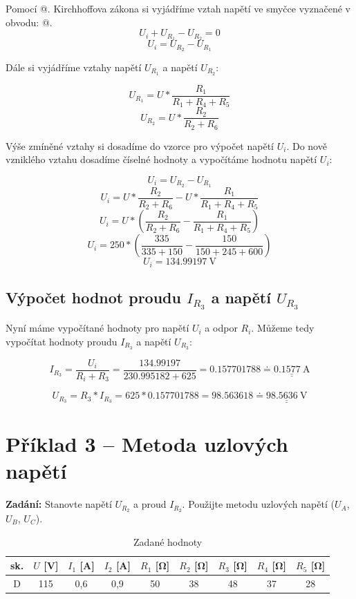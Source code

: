 \documentclass[a4paper]{article}
\makeatletter
\def\doubleunderline#1{\underline{\underline{#1}}}
\newcommand*{\rom}[1]{\expandafter\@slowromancap\romannumeral #1@}
\makeatother
\begin{document}
\noindent
Pomocí \rom{2}. Kirchhoffova zákona si vyjádříme vztah napětí ve smyčce vyznačené v obvodu:
\vfill
\noindent
\rom{1}.
\[U_i + U_{R_1} - U_{R_2} = 0\]
\[U_i = U_{R_2} - U_{R_1}\]

\noindent
Dále si vyjádříme vztahy napětí $U_{R_1}$ a napětí $U_{R_2}$:

\[U_{R_1} = U * \frac{R_1}{R_1 + R_4 + R_5}\]
\[U_{R_2} = U * \frac{R_2}{R_2 + R_6}\]

\noindent
Výše zmíněné vztahy si dosadíme do vzorce pro výpočet napětí $U_i$. 
Do nově vzniklého vztahu dosadíme číselné hodnoty a vypočítáme hodnotu napětí $U_i$: 

\[U_i = U_{R_2} - U_{R_1}\]
\[U_i = U * \frac{R_2}{R_2 + R_6} - U * \frac{R_1}{R_1 + R_4 + R_5}\]
\[U_i = U * \left(\frac{R_2}{R_2 + R_6} - \frac{R_1}{R_1 + R_4 + R_5} \right)\]
\[U_i = 250 * \left(\frac{335}{335 + 150} - \frac{150}{150 + 245 + 600} \right)\]
\[U_i = \SI{134,99197}{\volt}\]

\subsection{Výpočet hodnot proudu $I_{R_3}$ a napětí $U_{R_3}$}
Nyní máme vypočítané hodnoty pro napětí $U_i$ a odpor $R_i$. Můžeme tedy vypočítat hodnoty proudu $I_{R_3}$ \newline a napětí $U_{R_3}$:

\[I_{R_3} = \frac{U_i}{R_i + R_3} = \frac{\num{134,991 97}}{\num{230,995 182} + 625} = \num{0,157 701 788}  \doteq \doubleunderline{\SI{0,1577}{\ampere}}\]

\[U_{R_3} = R_3 * I_{R_3} = 625 * \num{0,157 701 788} = \num{98,563 618} \doteq \doubleunderline{\SI{98,5636}{\volt}}\]
\newpage


\section{Příklad 3 -- Metoda uzlových napětí}
\textbf{Zadání:} Stanovte napětí $U_{R_2}$ a proud $I_{R_2}$. Použijte metodu uzlových napětí ($U_A$, $U_B$, $U_C$).

\begin{table}[ht]
  \begin{center}
    \begin{tabular}{|c|c|c|c|c|c|c|c|c|} 
      \hline
       sk. & $U$ [\si{\volt}] & $I_1$ [\si{\ampere}] & $I_2$ [\si{\ampere}]
       & $R_1$ [\si{\ohm}] & $R_2$ [\si{\ohm}] & $R_3$ [\si{\ohm}]
       & $R_4$ [\si{\ohm}] & $R_5$ [\si{\ohm}]\\
       \hline
       D & 115 & 0,6 & 0,9 & 50 & 38 & 48 & 37 & 28\\
     \hline
    \end{tabular}
    \caption{Zadané hodnoty}
    \label{tab:3}
  \end{center}
 \end{table}
\end{document}
